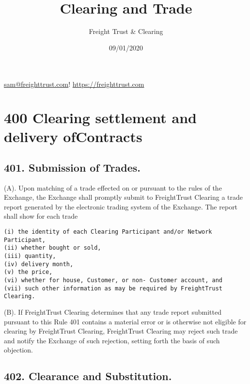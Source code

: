 \documentclass[12pt]{article}
\title{Clearing and Trade}
\author{Freight Trust & Clearing}
\date{09/01/2020}
\begin{document}
\maketitle

\href{mailto:sam@freighttrust.com}{sam@freighttrust.com}!
\url{https://freighttrust.com}


\hypertarget{clearing-settlement-and-delivery-of-contracts}{%
\section{400 Clearing settlement and delivery ofContracts}
\label{clearing-settlement-and-delivery-of-contracts}}

\hypertarget{submission-of-trades.}{%
\subsection{401. Submission of Trades.}\label{submission-of-trades.}}

(A). Upon matching of a trade effected on or pursuant to the rules of
the Exchange, the Exchange shall promptly submit to FreightTrust
Clearing a trade report generated by the electronic trading system of
the Exchange. The report shall show for each trade

\begin{verbatim}
(i) the identity of each Clearing Participant and/or Network Participant,
(ii) whether bought or sold,
(iii) quantity,
(iv) delivery month,
(v) the price,
(vi) whether for house, Customer, or non- Customer account, and
(vii) such other information as may be required by FreightTrust Clearing.
\end{verbatim}

(B). If FreightTrust Clearing determines that any trade report submitted
pursuant to this Rule 401 contains a material error or is otherwise not
eligible for clearing by FreightTrust Clearing, FreightTrust Clearing
may reject such trade and notify the Exchange of such rejection, setting
forth the basis of such objection.

\hypertarget{clearance-and-substitution.}{%
\subsection{402. Clearance and
Substitution.}\label{clearance-and-substitution.}}
\end{document}
